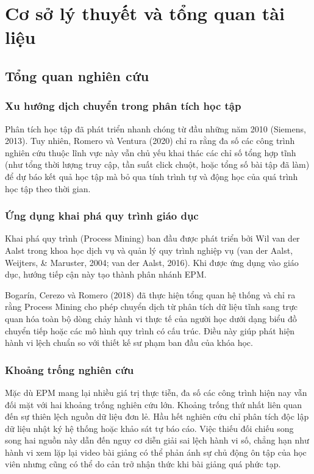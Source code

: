 \section{Cơ sở lý thuyết và tổng quan tài liệu}

\subsection{Tổng quan nghiên cứu}

\subsubsection{Xu hướng dịch chuyển trong phân tích học tập}
Phân tích học tập đã phát triển nhanh chóng từ đầu những năm 2010 (Siemens, 2013). Tuy nhiên, Romero và Ventura (2020) chỉ ra rằng đa số các công trình nghiên cứu thuộc lĩnh vực này vẫn chủ yếu khai thác các chỉ số tổng hợp tĩnh (như tổng thời lượng truy cập, tần suất click chuột, hoặc tổng số bài tập đã làm) để dự báo kết quả học tập mà bỏ qua tính trình tự và động học của quá trình học tập theo thời gian.

\subsubsection{Ứng dụng khai phá quy trình giáo dục}
Khai phá quy trình (Process Mining) ban đầu được phát triển bởi Wil van der Aalst trong khoa học dịch vụ và quản lý quy trình nghiệp vụ (van der Aalst, Weijters, \& Maruster, 2004; van der Aalst, 2016). Khi được ứng dụng vào giáo dục, hướng tiếp cận này tạo thành phân nhánh EPM. 

Bogarín, Cerezo và Romero (2018) đã thực hiện tổng quan hệ thống và chỉ ra rằng Process Mining cho phép chuyển dịch từ phân tích dữ liệu tĩnh sang trực quan hóa toàn bộ dòng chảy hành vi thực tế của người học dưới dạng biểu đồ chuyển tiếp hoặc các mô hình quy trình có cấu trúc. Điều này giúp phát hiện hành vi lệch chuẩn so với thiết kế sư phạm ban đầu của khóa học.

\subsubsection{Khoảng trống nghiên cứu}
Mặc dù EPM mang lại nhiều giá trị thực tiễn, đa số các công trình hiện nay vẫn đối mặt với hai khoảng trống nghiên cứu lớn. Khoảng trống thứ nhất liên quan đến sự thiên lệch nguồn dữ liệu đơn lẻ. Hầu hết nghiên cứu chỉ phân tích độc lập dữ liệu nhật ký hệ thống hoặc khảo sát tự báo cáo. Việc thiếu đối chiếu song song hai nguồn này dẫn đến nguy cơ diễn giải sai lệch hành vi số, chẳng hạn như hành vi xem lặp lại video bài giảng có thể phản ánh sự chủ động ôn tập của học viên nhưng cũng có thể do cản trở nhận thức khi bài giảng quá phức tạp. 


